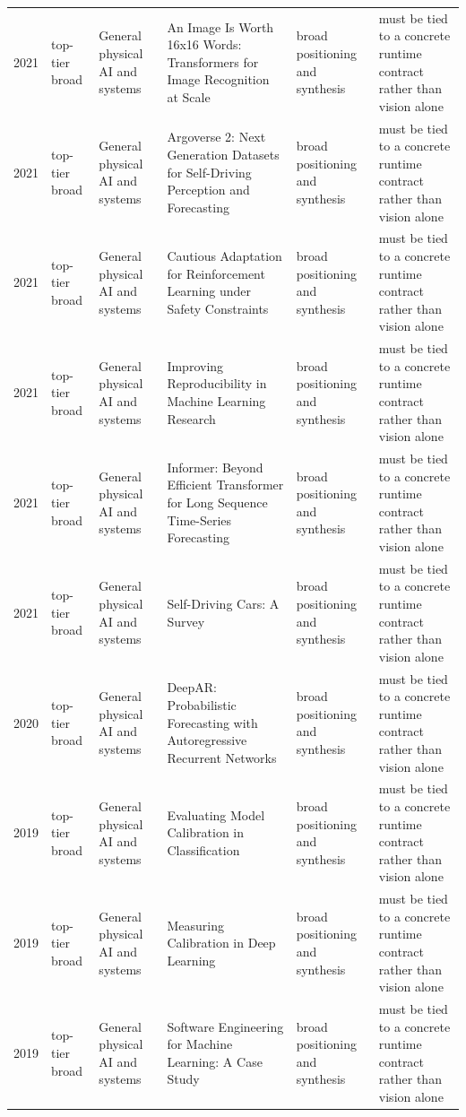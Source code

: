 \begin{longtable}{p{}p{}p{}p{}p{}p{}}
2021 & top-tier broad & General physical AI and systems & An Image Is Worth 16x16 Words: Transformers for Image Recognition at Scale & broad positioning and synthesis & must be tied to a concrete runtime contract rather than vision alone\\
2021 & top-tier broad & General physical AI and systems & Argoverse 2: Next Generation Datasets for Self-Driving Perception and Forecasting & broad positioning and synthesis & must be tied to a concrete runtime contract rather than vision alone\\
2021 & top-tier broad & General physical AI and systems & Cautious Adaptation for Reinforcement Learning under Safety Constraints & broad positioning and synthesis & must be tied to a concrete runtime contract rather than vision alone\\
2021 & top-tier broad & General physical AI and systems & Improving Reproducibility in Machine Learning Research & broad positioning and synthesis & must be tied to a concrete runtime contract rather than vision alone\\
2021 & top-tier broad & General physical AI and systems & Informer: Beyond Efficient Transformer for Long Sequence Time-Series Forecasting & broad positioning and synthesis & must be tied to a concrete runtime contract rather than vision alone\\
2021 & top-tier broad & General physical AI and systems & Self-Driving Cars: A Survey & broad positioning and synthesis & must be tied to a concrete runtime contract rather than vision alone\\
2020 & top-tier broad & General physical AI and systems & DeepAR: Probabilistic Forecasting with Autoregressive Recurrent Networks & broad positioning and synthesis & must be tied to a concrete runtime contract rather than vision alone\\
2019 & top-tier broad & General physical AI and systems & Evaluating Model Calibration in Classification & broad positioning and synthesis & must be tied to a concrete runtime contract rather than vision alone\\
2019 & top-tier broad & General physical AI and systems & Measuring Calibration in Deep Learning & broad positioning and synthesis & must be tied to a concrete runtime contract rather than vision alone\\
2019 & top-tier broad & General physical AI and systems & Software Engineering for Machine Learning: A Case Study & broad positioning and synthesis & must be tied to a concrete runtime contract rather than vision alone\\

\end{longtable}
